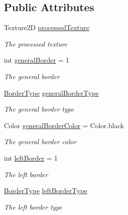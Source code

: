 \subsection*{Public Attributes}
\begin{DoxyCompactItemize}
\item 
Texture2D \hyperlink{class_lerp2_a_p_i_1_1_utility_1_1_texture_border_aa17ffd66a98abc635f274b184e0474a9}{processed\+Texture}
\begin{DoxyCompactList}\small\item\em The processed texture \end{DoxyCompactList}\item 
int \hyperlink{class_lerp2_a_p_i_1_1_utility_1_1_texture_border_a782898ac6a3c37eed5ddbcadd18c4803}{general\+Border} = 1
\begin{DoxyCompactList}\small\item\em The general border \end{DoxyCompactList}\item 
\hyperlink{namespace_lerp2_a_p_i_1_1_utility_a8046e09472382edc5b740291a380c94c}{Border\+Type} \hyperlink{class_lerp2_a_p_i_1_1_utility_1_1_texture_border_aaa235b42122d9d52ca0ff94e26654666}{general\+Border\+Type}
\begin{DoxyCompactList}\small\item\em The general border type \end{DoxyCompactList}\item 
Color \hyperlink{class_lerp2_a_p_i_1_1_utility_1_1_texture_border_aa344e83205ad06016928d0b1cdc5fad0}{general\+Border\+Color} = Color.\+black
\begin{DoxyCompactList}\small\item\em The general border color \end{DoxyCompactList}\item 
int \hyperlink{class_lerp2_a_p_i_1_1_utility_1_1_texture_border_a511423965b93557f98c473cee7189fef}{left\+Border} = 1
\begin{DoxyCompactList}\small\item\em The left border \end{DoxyCompactList}\item 
\hyperlink{namespace_lerp2_a_p_i_1_1_utility_a8046e09472382edc5b740291a380c94c}{Border\+Type} \hyperlink{class_lerp2_a_p_i_1_1_utility_1_1_texture_border_a4479dc4d78a901a874ef8a0977b6df29}{left\+Border\+Type}
\begin{DoxyCompactList}\small\item\em The left border type \end{DoxyCompactList}\item 

\end{DoxyCompactItemize}
